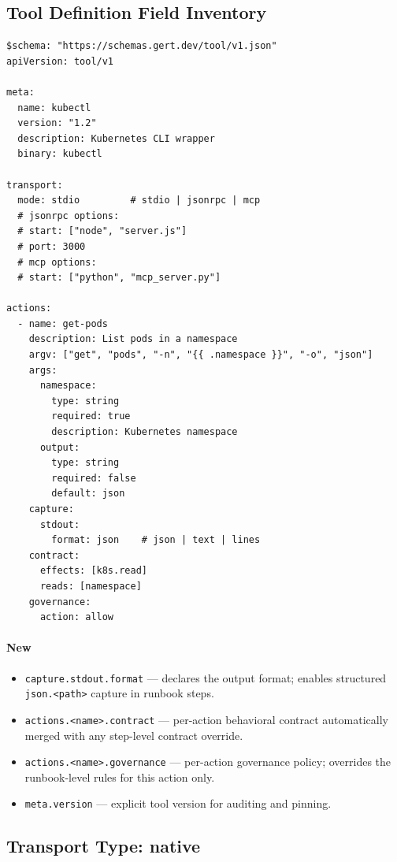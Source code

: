 \subsection{Tool Definition Field Inventory}
\label{subsec:tool-fields}

\begin{verbatim}
$schema: "https://schemas.gert.dev/tool/v1.json"
apiVersion: tool/v1

meta:
  name: kubectl
  version: "1.2"
  description: Kubernetes CLI wrapper
  binary: kubectl

transport:
  mode: stdio         # stdio | jsonrpc | mcp
  # jsonrpc options:
  # start: ["node", "server.js"]
  # port: 3000
  # mcp options:
  # start: ["python", "mcp_server.py"]

actions:
  - name: get-pods
    description: List pods in a namespace
    argv: ["get", "pods", "-n", "{{ .namespace }}", "-o", "json"]
    args:
      namespace:
        type: string
        required: true
        description: Kubernetes namespace
      output:
        type: string
        required: false
        default: json
    capture:
      stdout:
        format: json    # json | text | lines
    contract:
      effects: [k8s.read]
      reads: [namespace]
    governance:
      action: allow
\end{verbatim}

\paragraph{New}

\begin{itemize}
  \item \texttt{capture.stdout.format} — declares the output format; enables
        structured \texttt{json.<path>} capture in runbook steps.
  \item \texttt{actions.<name>.contract} — per-action behavioral contract
        automatically merged with any step-level contract override.
  \item \texttt{actions.<name>.governance} — per-action governance policy;
        overrides the runbook-level rules for this action only.
  \item \texttt{meta.version} — explicit tool version for auditing and pinning.
\end{itemize}

\subsection{Transport Type: native}
\label{subsec:transport-native}


